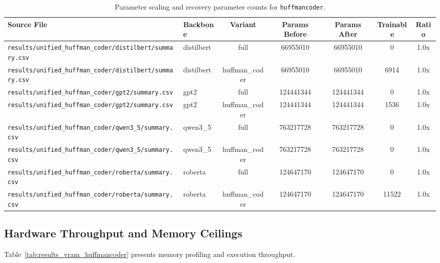 \begin{table}[t]
\centering
\small
\begin{tabular}{llccccc}
\toprule
\textbf{Source File} & \textbf{Backbone} & \textbf{Variant} & \textbf{Params Before} & \textbf{Params After} & \textbf{Trainable} & \textbf{Ratio} \\
\midrule
\texttt{results/unified\_huffman\_coder/distilbert/summary.csv} & distilbert & full & 66955010 & 66955010 & 0 & 1.0x \\
\texttt{results/unified\_huffman\_coder/distilbert/summary.csv} & distilbert & huffman\_coder & 66955010 & 66955010 & 6914 & 1.0x \\
\texttt{results/unified\_huffman\_coder/gpt2/summary.csv} & gpt2 & full & 124441344 & 124441344 & 0 & 1.0x \\
\texttt{results/unified\_huffman\_coder/gpt2/summary.csv} & gpt2 & huffman\_coder & 124441344 & 124441344 & 1536 & 1.0x \\
\texttt{results/unified\_huffman\_coder/qwen3\_5/summary.csv} & qwen3\_5 & full & 763217728 & 763217728 & 0 & 1.0x \\
\texttt{results/unified\_huffman\_coder/qwen3\_5/summary.csv} & qwen3\_5 & huffman\_coder & 763217728 & 763217728 & 0 & 1.0x \\
\texttt{results/unified\_huffman\_coder/roberta/summary.csv} & roberta & full & 124647170 & 124647170 & 0 & 1.0x \\
\texttt{results/unified\_huffman\_coder/roberta/summary.csv} & roberta & huffman\_coder & 124647170 & 124647170 & 11522 & 1.0x \\
\bottomrule
\end{tabular}
\caption{Parameter scaling and recovery parameter counts for \texttt{huffmancoder}.}
\label{tab:results_params_huffmancoder}
\end{table}

\subsection{Hardware Throughput and Memory Ceilings}
Table~\ref{tab:results_vram_huffmancoder} presents memory profiling and execution throughput.

